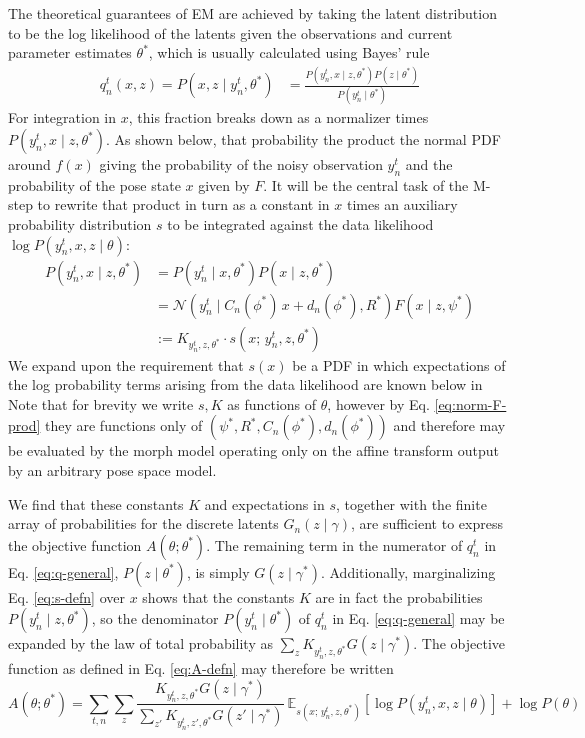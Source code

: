 \documentclass{article}         %
\newcommand{\EE}{\mathbb{E}}
\newcommand{\NN}{\mathcal{N}}
\newcommand{\bc}[1]{\left[ #1 \right]}
\begin{document}
The theoretical guarantees of EM are achieved by taking the latent distribution to be the log likelihood of the latents given the observations and current parameter estimates $\theta^*$, which is usually calculated using Bayes' rule
\begin{align}
    q_n^t(x, z) = P(x, z \mid y_n^t, \theta^*) &= \frac{P(y_n^t, x \mid z, \theta^*) P(z\mid \theta^*)}{P(y_n^t \mid \theta^*)}
    \label{eq:q-general}
\end{align}
For integration in $x$, this fraction breaks down as a normalizer times $P(y_n^t, x \mid z, \theta^*)$. As shown below, that probability the product the normal PDF around $f(x)$ giving the probability of the noisy observation $y_n^t$ and the probability of the pose state $x$ given by $F$. It will be the central task of the M-step to rewrite that product in turn as a constant in $x$ times an auxiliary probability distribution $s$ to be integrated against the data likelihood $\log P(y_n^t, x, z \mid \theta)$:
\begin{align}
    P(y_n^t, x \mid z, \theta^*) &= P(y_n^t \mid x, \theta^*) P(x\mid z, \theta^*) \\
    &= \NN(y_n^t\mid C_n(\phi^*)\, x + d_n(\phi^*), R^*) F(x\mid z, \psi^*) \label{eq:norm-F-prod} \\
    &:=  K_{y_n^t, z, \theta^*}\cdot s(x;\, y_n^t, z, \theta^*)
    \label{eq:s-defn}
\end{align}
We expand upon the requirement that $s(x)$ be a PDF in which expectations of the log probability terms arising from the data likelihood are known below in %
Note that for brevity we write $s, K$ as functions of $\theta$, however by Eq. \ref{eq:norm-F-prod} they are functions only of $(\psi^*, R^*, C_n(\phi^*), d_n(\phi^*))$ and therefore may be evaluated by the morph model operating only on the affine transform output by an arbitrary pose space model.

We find that these constants $K$ and expectations in $s$, together with the finite array of probabilities for the discrete latents $G_n(z \mid \gamma)$, are sufficient to express the objective function $A(\theta; \theta^*)$. The remaining term in the numerator of $q_n^t$ in Eq. \ref{eq:q-general}, $P(z\mid \theta^*)$, is simply $G(z\mid \gamma^*)$. Additionally, marginalizing Eq. \ref{eq:s-defn} over $x$ shows that the constants $K$ are in fact the probabilities $P(y_n^t \mid z, \theta^*)$, so the denominator $P(y_n^t \mid \theta^*)$ of $q_n^t$ in Eq. \ref{eq:q-general} may be expanded by the law of total probability as $\sum_z K_{y_n^t, z, \theta^*} G(z\mid \gamma^*)$. The objective function as defined in Eq. \ref{eq:A-defn} may therefore be written
\begin{equation}
    A(\theta; \theta^*) = \sum_{t, n}\sum_z  \frac{K_{y^t_n, z, \theta^*} G(z\mid \gamma^*)}{\sum_{z'} K_{y^t_n, z', \theta^*}  G(z'\mid\gamma^*)}\ \EE_{s(x;\, y^t_n, z, \theta^*)}\bc{\log P(y^t_n, x, z \mid \theta)} + \log P(\theta) \label{eq:A-tractable}
\end{equation}
\end{document}
